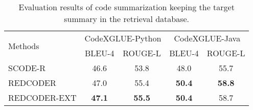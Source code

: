\documentclass[11pt]{article}
\newcommand{\tool}{{REDCODER}\xspace}
\newcommand{\toolext}{{REDCODER-EXT}\xspace}
\newcommand{\coder}{SCODE-R\xspace}
\begin{document}
\begin{table*}[!htb]
\centering
{}
\caption{
Ablation results on source code generation using the retrieved code and its summary together when the reference target code is absent and present in the retrieval database respectively.  
}
\label{table:code_translation}
\end{table*}



 









\begin{table*}[!htb]
\centering
\begin{tabular}{l|c@{\hskip 0.15in} c | c@{\hskip 0.15in} c }
\hline
\multirow{2}{*}{Methods}  & \multicolumn{2}{c|}{CodeXGLUE-Python} & \multicolumn{2}{c}{CodeXGLUE-Java} \\
\cline{2-5}
 & BLEU-4 & ROUGE-L & BLEU-4 & ROUGE-L \\
\hline
 \coder  & 46.6 & 53.8  & 48.0 & 55.7 \\
\tool& { 47.0} & { 55.4} & {\bf 50.4} & {\bf 58.8} \\
\toolext & {\bf 47.1} & {\bf 55.5} & {\bf 50.4} & { 58.7} \\
\hline
\end{tabular}
\caption{
Evaluation results of  code summarization keeping the target summary in the retrieval database.}
\label{tab:sum_improve_with_ref}
\end{table*}
 
\end{document}
